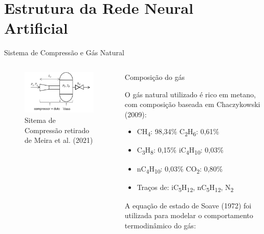 \section{Estrutura da Rede Neural Artificial}

\begin{frame}{Sistema de Compressão e Gás Natural}
    \begin{columns}[T] %
        \begin{column}{0.48\textwidth}
        \begin{figure}
            \centering
            \includegraphics[width=1.1\linewidth]{figures/compressao.png}
            \caption{Sitema de Compressão retirado de Meira et al. (2021)}
            \label{fig:enter-label}
        \end{figure}
        \end{column}

        \begin{column}{0.52\textwidth}
            \scriptsize
        \begin{block}{Composição do gás}
                
            O gás natural utilizado é rico em metano, com composição baseada em Chaczykowski (2009):
            
            \vspace{0.12cm}
            \begin{itemize}  
                \item CH\textsubscript{4}: 98,34\% \quad C\textsubscript{2}H\textsubscript{6}: 0,61\%
                \item C\textsubscript{3}H\textsubscript{8}: 0,15\% \quad iC\textsubscript{4}H\textsubscript{10}: 0,03\%
                \item nC\textsubscript{4}H\textsubscript{10}: 0,03\% \quad CO\textsubscript{2}: 0,80\%
                \item Traços de: iC\textsubscript{5}H\textsubscript{12}, nC\textsubscript{5}H\textsubscript{12}, N\textsubscript{2}
            \end{itemize}
        \end{block}
            \vspace{0.1cm}
            A equação de estado de Soave (1972) foi utilizada para modelar o comportamento termodinâmico do gás:


\end{column}
\end{columns}
\end{frame}
